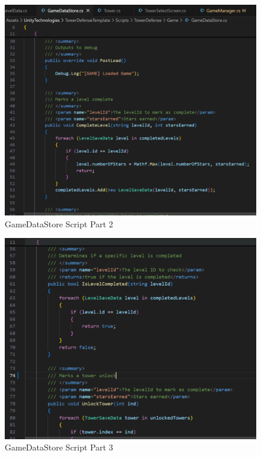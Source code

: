 \documentclass[12pt,a4paper]{report}
\begin{document}
\begin{figure}[h!]
	\centering
	\includegraphics[scale=0.75]{images/GameDataStore2.png}
	\caption{GameDataStore Script Part 2}
	\label{fig:GameDataStore2}
\end{figure}
 
\begin{figure}[h!]
	\centering
	\includegraphics[scale=0.75]{images/GameDataStore3.png}
	\caption{GameDataStore Script Part 3}
	\label{fig:GameDataStore3}
\end{figure}
 
\end{document}
